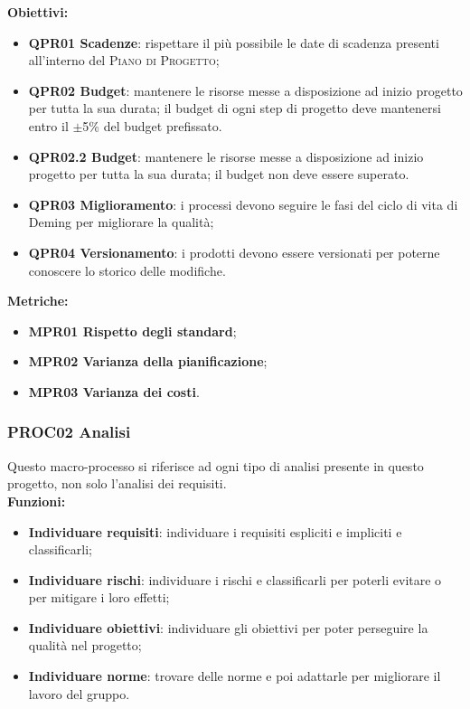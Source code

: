 \documentclass[../piano_di_qualifica.tex]{subfiles}
\begin{document}
\textbf{Obiettivi:}
\smallbreak
\begin{itemize}
	\item \textbf{QPR01 Scadenze}: rispettare il più possibile le date di scadenza presenti all'interno del \textsc{Piano di Progetto};
	\item \textbf{QPR02 Budget}: mantenere le risorse messe a disposizione ad inizio progetto per tutta la sua durata; il budget di ogni step di progetto deve mantenersi entro il $\pm$5\% del budget prefissato.
\item \textbf{QPR02.2 Budget}: mantenere le risorse messe a disposizione ad inizio progetto per tutta la sua durata; il budget non deve essere superato.
	\item \textbf{QPR03 Miglioramento}: i processi devono seguire le fasi del ciclo di vita di Deming per migliorare la qualità;
	\item \textbf{QPR04 Versionamento}: i prodotti devono essere versionati per poterne conoscere lo storico delle modifiche.
\end{itemize}

\textbf{Metriche:}
\smallbreak
\begin{itemize}
	\item \textbf{MPR01 Rispetto degli standard};
	\item \textbf{MPR02 Varianza della pianificazione};
	\item \textbf{MPR03 Varianza dei costi}.
\end{itemize}

\subsubsection{PROC02 Analisi}
Questo macro-processo si riferisce ad ogni tipo di analisi presente in questo progetto, non solo l'analisi dei requisiti.\\

\textbf{Funzioni:}
\smallbreak
\begin{itemize}
	\item \textbf{Individuare requisiti}: individuare i requisiti espliciti e impliciti e classificarli;
	\item \textbf{Individuare rischi}: individuare i rischi e classificarli per poterli evitare o per mitigare i loro effetti;
	\item \textbf{Individuare obiettivi}: individuare gli obiettivi per poter perseguire la qualità nel progetto;
	\item \textbf{Individuare norme}: trovare delle norme e poi adattarle per migliorare il lavoro del gruppo.
\end{itemize}
\end{document}
